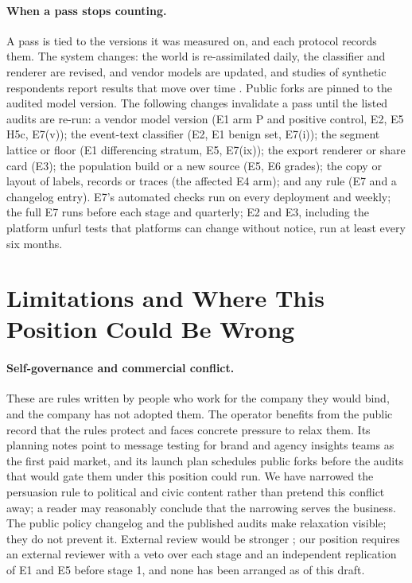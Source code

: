 \documentclass[11pt]{article}
\begin{document}
\paragraph{When a pass stops counting.} A pass is tied to the versions it was measured on, and each protocol records them. The system changes: the world is re-assimilated daily, the classifier and renderer are revised, and vendor models are updated, and studies of synthetic respondents report results that move over time \citep{bisbee2024synthetic}. Public forks are pinned to the audited model version. The following changes invalidate a pass until the listed audits are re-run: a vendor model version (E1 arm P and positive control, E2, E5 H5c, E7(v)); the event-text classifier (E2, E1 benign set, E7(i)); the segment lattice or floor (E1 differencing stratum, E5, E7(ix)); the export renderer or share card (E3); the population build or a new source (E5, E6 grades); the copy or layout of labels, records or traces (the affected E4 arm); and any rule (E7 and a changelog entry). E7's automated checks run on every deployment and weekly; the full E7 runs before each stage and quarterly; E2 and E3, including the platform unfurl tests that platforms can change without notice, run at least every six months.

\section{Limitations and Where This Position Could Be Wrong}
\label{sec:limits}

\paragraph{Self-governance and commercial conflict.} These are rules written by people who work for the company they would bind, and the company has not adopted them. The operator benefits from the public record that the rules protect and faces concrete pressure to relax them. Its planning notes point to message testing for brand and agency insights teams as the first paid market, and its launch plan schedules public forks before the audits that would gate them under this position could run. We have narrowed the persuasion rule to political and civic content rather than pretend this conflict away; a reader may reasonably conclude that the narrowing serves the business. The public policy changelog and the published audits make relaxation visible; they do not prevent it. External review would be stronger \citep{raji2022outsider}; our position requires an external reviewer with a veto over each stage and an independent replication of E1 and E5 before stage 1, and none has been arranged as of this draft.
\end{document}
